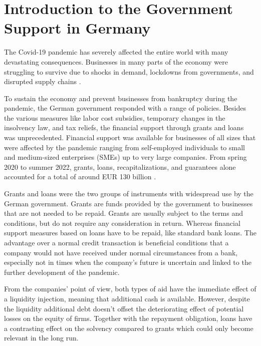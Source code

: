 
\chapter{Introduction to the Government Support in Germany} %

\label{Chapter1} %




The Covid-19 pandemic has severely affected the entire world with many devastating consequences. Businesses in many parts of the economy were struggling to survive due to shocks in demand, lockdowns from governments, and disrupted supply chains \parencite{eu_com_temporary_2020}.

To sustain the economy and prevent businesses from bankruptcy during the pandemic, the German government responded with a range of policies. Besides the various measures like labor cost subsidies, temporary changes in the insolvency law, and tax reliefs, the financial support through grants and loans was unprecedented. Financial support was available for businesses of all sizes that were affected by the pandemic ranging from self-employed individuals to small and medium-sized enterprises (SMEs) up to very large companies. From spring 2020 to summer 2022, grants, loans, recapitalizations, and guarantees alone accounted for a total of around EUR 130 billion \parencite{bmwk_uberblickspapier_2022}. 

Grants and loans were the two groups of instruments with widespread use by the German government. Grants are funds provided by the government to businesses that are not needed to be repaid. Grants are usually subject to the terms and conditions, but do not require any consideration in return. Whereas financial support measures based on loans have to be repaid, like standard bank loans. The advantage over a normal credit transaction is beneficial conditions that a company would not have received under normal circumstances from a bank, especially not in times when the company's future is uncertain and linked to the further development of the pandemic. 

From the companies' point of view, both types of aid have the immediate effect of a liquidity injection, meaning that additional cash is available. However, despite the liquidity additional debt doesn't offset the deteriorating effect of potential losses on the equity of firms. Together with the repayment obligation, loans have a contrasting effect on the solvency compared to grants which could only become relevant in the long run.

